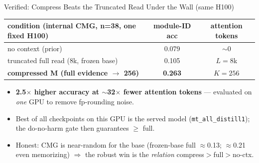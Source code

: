 \begin{frame}{Verified: Compress Beats the Truncated Read Under the Wall (same H100)}
  \small
  \begin{table}\centering
    \begin{tabular}{lcc}
      \toprule
      condition (internal CMG, n=38, one fixed H100) & module-ID acc & attention tokens \\
      \midrule
      no context (prior) & 0.079 & $\sim$0 \\
      truncated full read (8k, frozen base) & 0.105 & $L=8$k \\
      \textbf{compressed M (full evidence $\to$ 256)} & \textbf{0.263} & $K=256$ \\
      \bottomrule
    \end{tabular}
  \end{table}
  \begin{itemize}
    \item \textbf{2.5$\times$ higher accuracy at $\sim$32$\times$ fewer attention tokens} --- evaluated on \emph{one} GPU to remove fp-rounding noise.
    \item Best of all checkpoints on this GPU is the served model (\texttt{mt\_all\_distill1}); the do-no-harm gate then guarantees $\ge$ full.
    \item Honest: CMG is near-random for the base (frozen-base full $\approx$0.13; $\approx$0.21 even memorizing) $\Rightarrow$ the robust win is the \emph{relation} compress$>$full$>$no-ctx.
  \end{itemize}
\end{frame}

